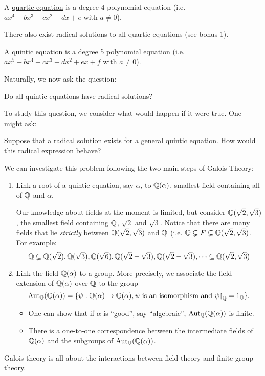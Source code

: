 \documentclass[11pt]{article}
\begin{document}
\begin{definition}
    A \ul{quartic equation} is a degree 4 polynomial equation (i.e. $ax^4+bx^3+cx^2+dx+e$ with $a\neq0$).
\end{definition}

\begin{note}
    There also exist radical solutions to all quartic equations (see bonus 1).
\end{note}

\begin{definition}
    A \ul{quintic equation} is a degree 5 polynomial equation (i.e. $ax^5+bx^4+cx^3+dx^2+ex+f$ with $a\neq0$).
\end{definition}

Naturally, we now ask the question:

\begin{centeremph}
    Do all quintic equations have radical solutions?
\end{centeremph}

To study this question, we consider what would happen if it were true. One might ask:

\begin{centeremph}
    Suppose that a radical solution exists for a general quintic equation. How would this radical expression behave?
\end{centeremph}

We can investigate this problem following the two main steps of Galois Theory:
\begin{enumerate}
    \item Link a root of a quintic equation, say $\alpha$, to $\mathbb{Q}(\alpha)$, smallest field containing all of $\mathbb{Q}$ and $\alpha$.

    Our knowledge about fields at the moment is limited, but consider $\mathbb{Q}(\sqrt{2},\sqrt{3})$, the smallest field containing $\mathbb{Q}$, $\sqrt{2}$ and $\sqrt{3}$. Notice that there are many fields that lie \emph{strictly} between $\mathbb{Q}(\sqrt{2},\sqrt{3})$ and $\mathbb{Q}$ (i.e. $\mathbb{Q}\subsetneq F\subsetneq\mathbb{Q}(\sqrt{2},\sqrt{3})$. For example:
    \[\mathbb{Q}\subsetneq\mathbb{Q}(\sqrt{2}),\mathbb{Q}(\sqrt{3}),\mathbb{Q}(\sqrt{6}),\mathbb{Q}(\sqrt{2}+\sqrt{3}),\mathbb{Q}(\sqrt{2}-\sqrt{3}),\cdots\subsetneq\mathbb{Q}(\sqrt{2},\sqrt{3})\]
    \item Link the field $\mathbb{Q}(\alpha)$ to a group. More precisely, we associate the field extension of $\mathbb{Q}(\alpha)$ over $\mathbb{Q}$ to the group
    \[\operatorname{Aut}_{\mathbb{Q}}(\mathbb{Q}(\alpha))=\{\psi:\mathbb{Q}(\alpha)\to\mathbb{Q}(\alpha),\text{$\psi$ is an isomorphism and $\psi{\upharpoonright}_{\mathbb{Q}}=1_{\mathbb{Q}}$}\}.\]
    \begin{itemize}
        \item One can show that if $\alpha$ is ``good'', say ``algebraic'', $\operatorname{Aut}_{\mathbb{Q}}(\mathbb{Q}(\alpha))$ is finite.
        \item There is a one-to-one correspondence between the intermediate fields of $\mathbb{Q}(\alpha)$ and the subgroups of $\operatorname{Aut}_{\mathbb{Q}}(\mathbb{Q}(\alpha))$.
    \end{itemize}
\end{enumerate}
Galois theory is all about the interactions between field theory and finite group theory.
\end{document}
